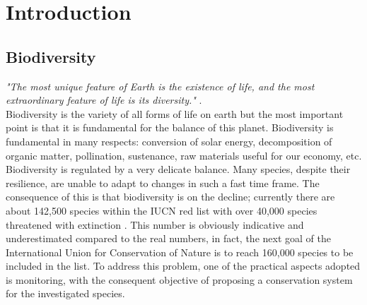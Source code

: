 \documentclass[12pt,a4paper]{article}
\begin{document}
\section{Introduction}
\subsection{Biodiversity}
\textit{"The most unique feature of Earth is the existence of life, and the most extraordinary feature of life is its diversity."} \citep{cardinale}.\\
Biodiversity is the variety of all forms of life on earth but the most important point is that it is fundamental for the balance of this planet.
Biodiversity is fundamental in many respects: conversion of solar energy, decomposition of organic matter, pollination, sustenance, raw materials useful for our economy, etc.
Biodiversity is regulated by a very delicate balance.
Many species, despite their resilience, are unable to adapt to changes in such a fast time frame.
The consequence of this is that biodiversity is on the decline; currently there are about 142,500 species within the IUCN red list with over 40,000 species threatened with extinction \citep{IUCN}. This number is obviously indicative and underestimated compared to the real numbers, in fact, the next goal of the International Union for Conservation of Nature is to reach 160,000 species to be included in the list.
To address this problem, one of the practical aspects adopted is monitoring, with the consequent objective of proposing a conservation system for the investigated species.
\end{document}
